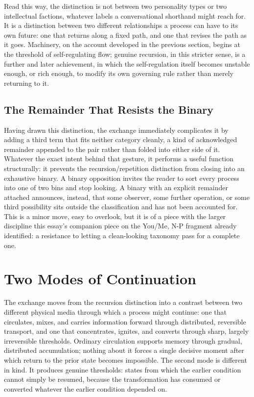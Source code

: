 \documentclass[11pt]{article}
\begin{document}
Read this way, the distinction is not between two personality types or two intellectual factions, whatever labels a conversational shorthand might reach for. It is a distinction between two different relationships a process can have to its own future: one that returns along a fixed path, and one that revises the path as it goes. Machinery, on the account developed in the previous section, begins at the threshold of self-regulating flow; genuine recursion, in this stricter sense, is a further and later achievement, in which the self-regulation itself becomes unstable enough, or rich enough, to modify its own governing rule rather than merely returning to it.

\subsection{The Remainder That Resists the Binary}

Having drawn this distinction, the exchange immediately complicates it by adding a third term that fits neither category cleanly, a kind of acknowledged remainder appended to the pair rather than folded into either side of it. Whatever the exact intent behind that gesture, it performs a useful function structurally: it prevents the recursion/repetition distinction from closing into an exhaustive binary. A binary opposition invites the reader to sort every process into one of two bins and stop looking. A binary with an explicit remainder attached announces, instead, that some observer, some further operation, or some third possibility sits outside the classification and has not been accounted for. This is a minor move, easy to overlook, but it is of a piece with the larger discipline this essay's companion piece on the You/Me, N-P fragment already identified: a resistance to letting a clean-looking taxonomy pass for a complete one.

\section{Two Modes of Continuation}

The exchange moves from the recursion distinction into a contrast between two different physical media through which a process might continue: one that circulates, mixes, and carries information forward through distributed, reversible transport, and one that concentrates, ignites, and converts through sharp, largely irreversible thresholds. Ordinary circulation supports memory through gradual, distributed accumulation; nothing about it forces a single decisive moment after which return to the prior state becomes impossible. The second mode is different in kind. It produces genuine thresholds: states from which the earlier condition cannot simply be resumed, because the transformation has consumed or converted whatever the earlier condition depended on.
\end{document}
